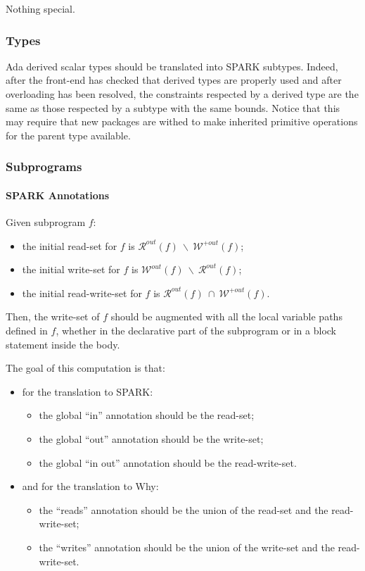 \documentclass{article}
\newcommand{\outallwrites}[1]{\ensuremath{\mathcal{W}^{+out}(#1)}\xspace}
\newcommand{\outwrites}[1]{\ensuremath{\mathcal{W}^{out}(#1)}\xspace}
\newcommand{\outreads}[1]{\ensuremath{\mathcal{R}^{out}(#1)}\xspace}
\newcommand{\inter}{~\cap~}
\newcommand{\minus}{~\backslash~}
\begin{document}
Nothing special.

\subsubsection{Types}
\label{SPARK2SPARK:types}

Ada derived scalar types should be translated into SPARK subtypes. Indeed,
after the front-end has checked that derived types are properly used and after
overloading has been resolved, the constraints respected by a derived type are
the same as those respected by a subtype with the same bounds. Notice that this
may require that new packages are withed to make inherited primitive operations
for the parent type available.

\subsubsection{Subprograms}

\paragraph{SPARK Annotations}

Given subprogram $f$:
\begin{itemize}
\item the initial read-set for $f$ is $\outreads{f} \minus \outallwrites{f}$;
\item the initial write-set for $f$ is $\outwrites{f} \minus \outreads{f}$;
\item the initial read-write-set for $f$ is $\outreads{f} \inter
  \outallwrites{f}$.
\end{itemize}

Then, the write-set of $f$ should be augmented with all the local variable paths
defined in $f$, whether in the declarative part of the subprogram or in a block
statement inside the body.

The goal of this computation is that:
\begin{itemize}
\item for the translation to SPARK:
\begin{itemize}
\item the global ``in'' annotation should be the read-set;
\item the global ``out'' annotation should be the write-set;
\item the global ``in out'' annotation should be the read-write-set.
\end{itemize}
\item and for the translation to Why:
\begin{itemize}
\item the ``reads'' annotation should be the union of the read-set and the
  read-write-set;
\item the ``writes'' annotation should be the union of the write-set and the
  read-write-set.
\end{itemize}
\end{itemize}
\end{document}
